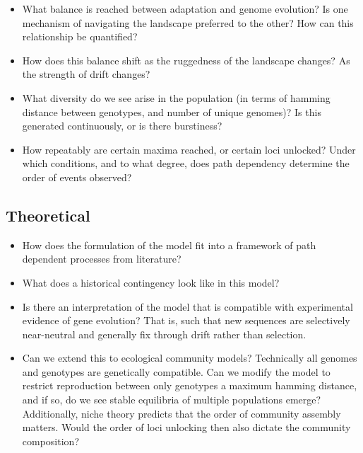 \documentclass[paper=a4, fontsize=11pt,twoside]{scrartcl}       %
\begin{document}
    	    \begin{itemize}
		
		    \item What balance is reached between adaptation and genome evolution? Is one mechanism of navigating the landscape preferred to the other? How can this relationship be quantified?
		    \item How does this balance shift as the ruggedness of the landscape changes? As the strength of drift changes?
		    \item What diversity do we see arise in the population (in terms of hamming distance between genotypes, and number of unique genomes)? Is this generated continuously, or is there burstiness? \cite{gohBurstinessMemoryComplex2008}
		    \item How repeatably are certain maxima reached, or certain loci unlocked? Under which conditions, and to what degree, does path dependency determine the order of events observed? 

	    \end{itemize}

	\subsection{Theoretical}

	    \begin{itemize}
   	        
		    \item How does the formulation of the model fit into a framework of path dependent processes from literature? \cite{jacksonModelingMeasuringDistinguishing2012}
		    \item What does a historical contingency look like in this model?
		    \item Is there an interpretation of the model that is compatible with experimental evidence of gene evolution? That is, such that new sequences are selectively near-neutral and generally fix through drift rather than selection. \cite{lynchFrailtyAdaptiveHypotheses2007}
		    \item Can we extend this to ecological community models? Technically all genomes and genotypes are genetically compatible. Can we modify the model to restrict reproduction between only genotypes a maximum hamming distance, and if so, do we see stable equilibria of multiple populations emerge? Additionally, niche theory predicts that the order of community assembly matters. Would the order of loci unlocking then also dictate the community composition?

	    \end{itemize}
\end{document}
